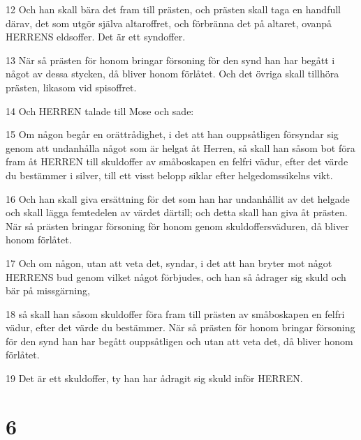 \par 12 Och han skall bära det fram till prästen, och prästen skall taga en handfull därav, det som utgör själva altaroffret, och förbränna det på altaret, ovanpå HERRENS eldsoffer. Det är ett syndoffer.
\par 13 När så prästen för honom bringar försoning för den synd han har begått i något av dessa stycken, då bliver honom förlåtet. Och det övriga skall tillhöra prästen, likasom vid spisoffret.
\par 14 Och HERREN talade till Mose och sade:
\par 15 Om någon begår en orättrådighet, i det att han ouppsåtligen försyndar sig genom att undanhålla något som är helgat åt Herren, så skall han såsom bot föra fram åt HERREN till skuldoffer av småboskapen en felfri vädur, efter det värde du bestämmer i silver, till ett visst belopp siklar efter helgedomssikelns vikt.
\par 16 Och han skall giva ersättning för det som han har undanhållit av det helgade och skall lägga femtedelen av värdet därtill; och detta skall han giva åt prästen. När så prästen bringar försoning för honom genom skuldoffersväduren, då bliver honom förlåtet.
\par 17 Och om någon, utan att veta det, syndar, i det att han bryter mot något HERRENS bud genom vilket något förbjudes, och han så ådrager sig skuld och bär på missgärning,
\par 18 så skall han såsom skuldoffer föra fram till prästen av småboskapen en felfri vädur, efter det värde du bestämmer. När så prästen för honom bringar försoning för den synd han har begått ouppsåtligen och utan att veta det, då bliver honom förlåtet.
\par 19 Det är ett skuldoffer, ty han har ådragit sig skuld inför HERREN.

\chapter{6}

